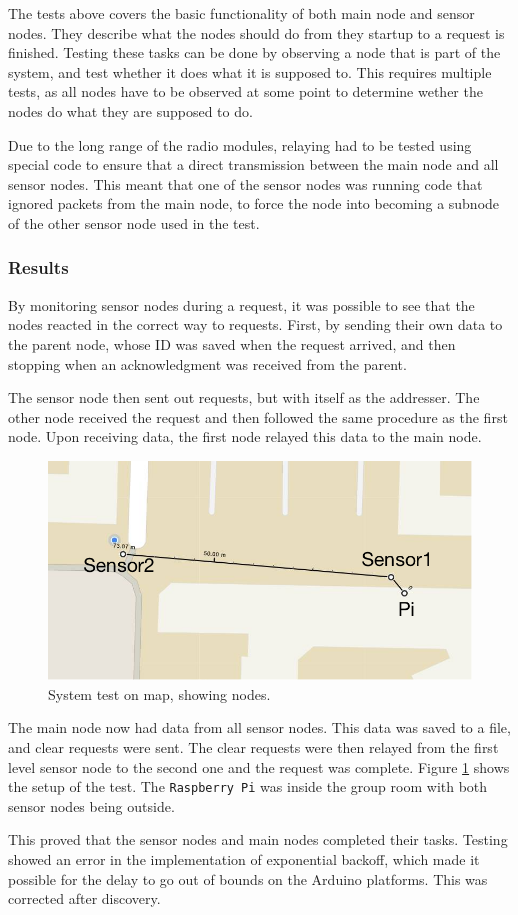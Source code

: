 The tests above covers the basic functionality of both main node and sensor nodes. They describe what the nodes should do from they startup to a request is finished.
Testing these tasks can be done by observing a node that is part of the system, and test whether it does what it is supposed to. This requires multiple tests, as all nodes have to be observed at some point to determine wether the nodes do what they are supposed to do.

Due to the long range of the radio modules, relaying had to be tested using special code to ensure that a direct transmission between the main node and all sensor nodes. This meant that one of the sensor nodes was running code that ignored packets from the main node, to force the node into becoming a subnode of the other sensor node used in the test.

\subsubsection*{Results}
By monitoring sensor nodes during a request, it was possible to see that the nodes reacted in the correct way to requests. First, by sending their own data to the parent node, whose ID was saved when the request arrived, and then stopping when an acknowledgment was received from the parent.

The sensor node then sent out requests, but with itself as the addresser. The other node received the request and then followed the same procedure as the first node. Upon receiving data, the first node relayed this data to the main node.

\begin{figure}[h!]
\centering
\includegraphics[width=1\textwidth]{chapters/test/figures/systest.png}
\caption{System test on map, showing nodes.}
\label{fig:systest}
\end{figure}

The main node now had data from all sensor nodes. This data was saved to a file, and clear requests were sent. The clear requests were then relayed from the first level sensor node to the second one and the request was complete. Figure \ref{fig:systest} shows the setup of the test. The \texttt{Raspberry Pi} was inside the group room with both sensor nodes being outside.

This proved that the sensor nodes and main nodes completed their tasks. Testing showed an error in the implementation of exponential backoff, which made it possible for the delay to go out of bounds on the Arduino platforms. This was corrected after discovery.


